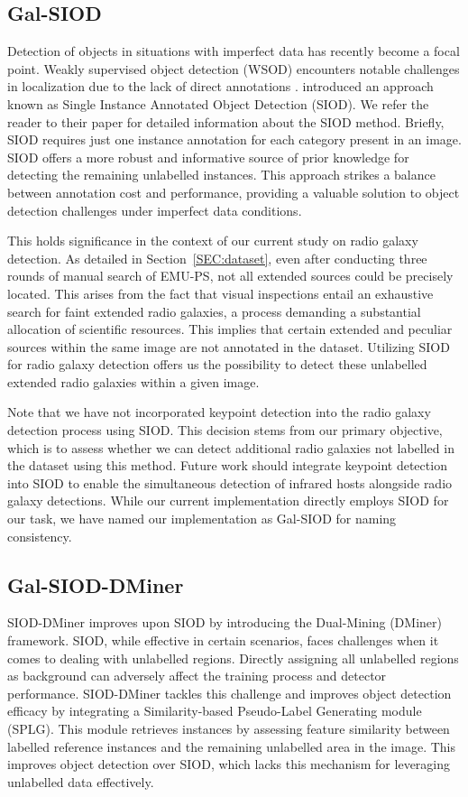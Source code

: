 \documentclass[
  journal=pasa,
  manuscript=research-paper, %
  year=2020,
  volume=37,
]{cup-journal}
\begin{document}
\subsection{Gal-SIOD}
\label{SEC:GalSIOD}
Detection of objects in situations with imperfect data has recently become a focal point. 
Weakly supervised object detection (WSOD) encounters notable challenges in localization due to the lack of direct annotations \citep[e.g.][]{gupta2023a}.  
\citet{li2022siod} introduced an approach known as Single Instance Annotated Object Detection (SIOD). 
We refer the reader to their paper for detailed information about the SIOD method.
Briefly, SIOD requires just one instance annotation for each category present in an image.
SIOD offers a more robust and informative source of prior knowledge for detecting the remaining unlabelled instances. 
This approach strikes a balance between annotation cost and performance, providing a valuable solution to object detection challenges under imperfect data conditions.

This holds significance in the context of our current study on radio galaxy detection.
As detailed in Section~\ref{SEC:dataset}, even after conducting three rounds of manual search of EMU-PS, not all extended sources could be precisely located.
This arises from the fact that visual inspections entail an exhaustive search for faint extended radio galaxies, a process demanding a substantial allocation of scientific resources.
This implies that certain extended and peculiar sources within the same image are not annotated in the dataset.
Utilizing SIOD for radio galaxy detection offers us the possibility to detect these unlabelled extended radio galaxies within a given image.

Note that we have not incorporated keypoint detection into the radio galaxy detection process using SIOD. 
This decision stems from our primary objective, which is to assess whether we can detect additional radio galaxies not labelled in the dataset using this method. 
Future work should integrate keypoint detection into SIOD to enable the simultaneous detection of infrared hosts alongside radio galaxy detections. 
While our current implementation directly employs SIOD for our task, we have named our implementation as Gal-SIOD for naming consistency.

\subsection{Gal-SIOD-DMiner}
\label{SEC:GalSIODD}
SIOD-DMiner \citep[][]{li2022siod} improves upon SIOD by introducing the Dual-Mining (DMiner) framework. 
SIOD, while effective in certain scenarios, faces challenges when it comes to dealing with unlabelled regions. 
Directly assigning all unlabelled regions as background can adversely affect the training process and detector performance. 
SIOD-DMiner tackles this challenge and improves object detection efficacy by integrating a Similarity-based Pseudo-Label Generating module (SPLG). 
This module retrieves instances by assessing feature similarity between labelled reference instances and the remaining unlabelled area in the image.
This improves object detection over SIOD, which lacks this mechanism for leveraging unlabelled data effectively.
\end{document}
